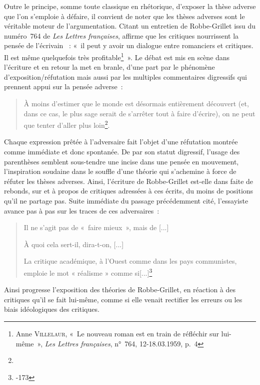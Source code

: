 \documentclass[12pt, a4paper]{article}
\begin{document}
Outre le principe, somme toute classique en rhétorique, d'exposer la thèse adverse que l'on s'emploie à défaire, il convient de noter que les thèses adverses sont le véritable moteur de l'argumentation. Citant un entretien de Robbe-Grillet issu du numéro~764 de \textit{Les Lettres françaises}, \galia{} affirme que les critiques nourrissent la pensée de l'écrivain \robbe~: «~il peut y avoir un dialogue entre romanciers et critiques. Il est même quelquefois très profitable\footnote{Anne \textsc{Villelaur}, «~Le nouveau roman est en train de réfléchir sur lui-même~», \textit{Les Lettres françaises}, n°~764, 12-18.03.1959, p.~4}~». Le débat est mis en scène dans l'écriture et en retour la met en branle, d'une part par le phénomène d'exposition/réfutation mais aussi par les multiples commentaires digressifs qui prennent appui sur la pensée adverse~: 
\begin{quote}
À moins d’estimer que le monde est désormais entièrement découvert (et, dans ce cas, le plus sage serait de s’arrêter tout à faire d’écrire), on ne peut que tenter d’aller plus loin\footnote{}.    
\end{quote}
Chaque expression prêtée à l'adversaire fait l'objet d'une réfutation montrée comme immédiate et donc spontanée. De par son statut digressif, l'usage des parenthèses semblent sous-tendre une incise dans une pensée en mouvement, l'inspiration soudaine dans le souffle d'une théorie qui s'achemine à force de réfuter les thèses adverses. Ainsi, l'écriture de Robbe-Grillet est-elle dans \punr{} faite de rebonds, sur et à propos de critiques adressées à ces écrits, du moins de positions qu'il ne partage pas. Suite immédiate du passage précédemment cité, l'essayiste avance pas à pas sur les traces de ces adversaires~:
\begin{quote}
    Il ne s’agit pas de «~faire mieux~», mais de [...]
    
    À quoi cela sert-il, dira-t-on, [...]
    
    La critique académique, à l’Ouest comme dans les pays communistes, emploie le mot « réalisme » comme si[...]\footnote{-173}
\end{quote}

Ainsi progresse l'exposition des théories de Robbe-Grillet, en réaction à des critiques qu'il se fait lui-même, comme si elle venait rectifier les erreurs ou les biais idéologiques des critiques.

\end{document}
